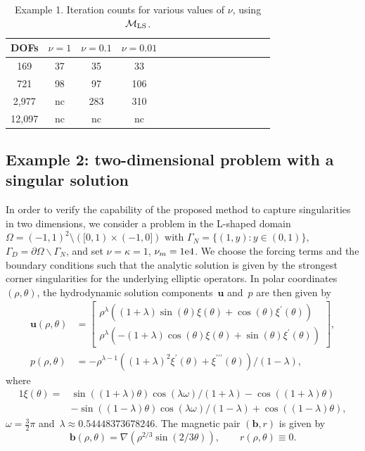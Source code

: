 \documentclass{siamltex}
\newcommand{\uu}[1]{\boldsymbol #1}                     %
\begin{document}
\begin{table}[!ht]
\begin{center}
\begin{tabular}{ccccccccccccccc}
\hline
DOFs& $\nu = 1$ & $\nu = 0.1$ & $\nu = 0.01$ \\
\hline
169 & 37 & 35 & 33 \\
721 & 98 & 97 & 106\\
2,977 & nc & 283 & 310 \\
12,097 & nc & nc & nc\\
\hline
\end{tabular}
\caption{Example 1. Iteration counts for various values of $\nu$, using $\mathcal{M}_{\rm LS}$.}
\label{tab:smooth_iterations_pa}
\end{center}
\end{table}



\subsection{Example 2: two-dimensional problem with a singular solution}


In order to verify the capability of the proposed method to capture
singularities in two dimensions, we consider a problem in the
L-shaped domain $\Omega=(-1,1)^2\setminus ([0,1)\times (-1,0])$ with
$\Gamma_N = \{(1, y) : y\in (0, 1)\}$, $\Gamma_D = \partial \Omega
\backslash \Gamma_N$, and set $\nu = \kappa = 1$, $\nu_m =\rm{1e4}$.
We choose the forcing terms and the boundary conditions such that
the analytic solution is given by the strongest corner singularities
for the underlying elliptic operators. In polar coordinates
$(\rho,\theta)$, the hydrodynamic solution components~$\uu{u}$ and~$p$
are then given by
\begin{equation*}
\begin{split}
\uu{u}(\rho,\theta) &=
\begin{bmatrix}
\rho^\lambda((1+\lambda)\sin(\theta)\xi(\theta)+\cos(\theta)\xi^{\prime}(\theta))\\[.1cm]
\rho^\lambda(-(1+\lambda)\cos(\theta)\xi(\theta)+\sin(\theta)\xi^{\prime}(\theta))
\end{bmatrix},\\[0.1cm]
p(\rho,\theta) &=
-\rho^{\lambda-1}((1+\lambda)^2\xi^{\prime}(\theta)+\xi^{\prime\prime
\prime}(\theta)) /(1-\lambda),
\end{split}
\end{equation*}
where
\begin{alignat*}1
\xi(\theta) =& \sin((1+\lambda)\theta)\cos(\lambda \omega)/(1+\lambda) -
\cos((1+\lambda)\theta) \\[0.1cm]
 &-\sin((1-\lambda)\theta)\cos(\lambda
\omega)/(1-\lambda)+\cos((1-\lambda)\theta),
\end{alignat*}
$\omega=\frac{3}{2}\pi$ and~$\lambda \approx 0.54448373678246$. The
magnetic pair $(\uu{b},r)$ is given by
$$\uu{b}(\rho,\theta)= \nabla(\rho^{2/3} \sin{(2/3\theta)}), \qquad r(\rho,\theta)\equiv 0.$$
\end{document}
